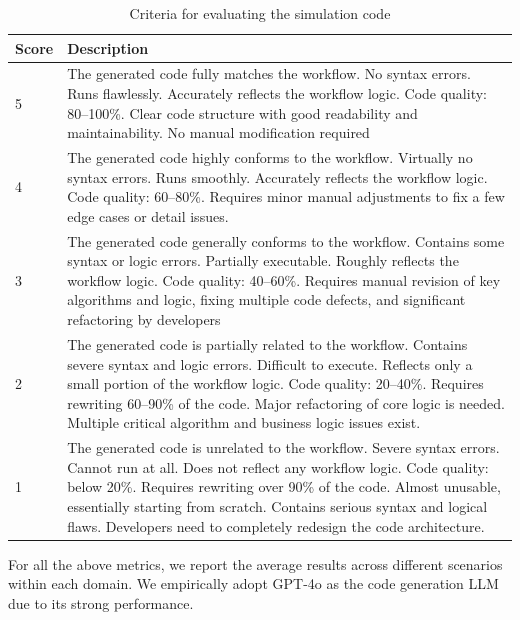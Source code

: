 \documentclass{article}
\theoremstyle{definition}
\theoremstyle{theorem}
\theoremstyle{proof}
\theoremstyle{remark}
\begin{document}
    \begin{table}[t]
    \centering
    \caption{Criteria for evaluating the simulation code}
    \renewcommand\arraystretch{1.2}
    \label{cre:simu}
    \begin{tabular}{m{}<{\centering}|
    m{12.0cm}<{\raggedright}}
    \hline\hline
    \textbf{Score} & \textbf{Description} \\
    \hline
    5 &  The generated code fully matches the workflow. No syntax errors. Runs flawlessly. Accurately reflects the workflow logic. Code quality: 80–100\%. Clear code structure with good readability and maintainability. No manual modification required \\\hline
    4 &  The generated code highly conforms to the workflow. Virtually no syntax errors. Runs smoothly. Accurately reflects the workflow logic. Code quality: 60–80\%. Requires minor manual adjustments to fix a few edge cases or detail issues. \\\hline
    3 &  The generated code generally conforms to the workflow. Contains some syntax or logic errors. Partially executable. Roughly reflects the workflow logic. Code quality: 40–60\%. Requires manual revision of key algorithms and logic, fixing multiple code defects, and significant refactoring by developers \\\hline
    2 &  The generated code is partially related to the workflow. Contains severe syntax and logic errors. Difficult to execute. Reflects only a small portion of the workflow logic. Code quality: 20–40\%. Requires rewriting 60–90\% of the code. Major refactoring of core logic is needed. Multiple critical algorithm and business logic issues exist. \\\hline
    1 & The generated code is unrelated to the workflow. Severe syntax errors. Cannot run at all. Does not reflect any workflow logic. Code quality: below 20\%. Requires rewriting over 90\% of the code. Almost unusable, essentially starting from scratch. Contains serious syntax and logical flaws. Developers need to completely redesign the code architecture. \\
    \hline\hline
    \end{tabular}
    \end{table}

    For all the above metrics, we report the average results across different scenarios within each domain. We empirically adopt {GPT-4o} as the code generation LLM due to its strong performance.
    
\end{document}
